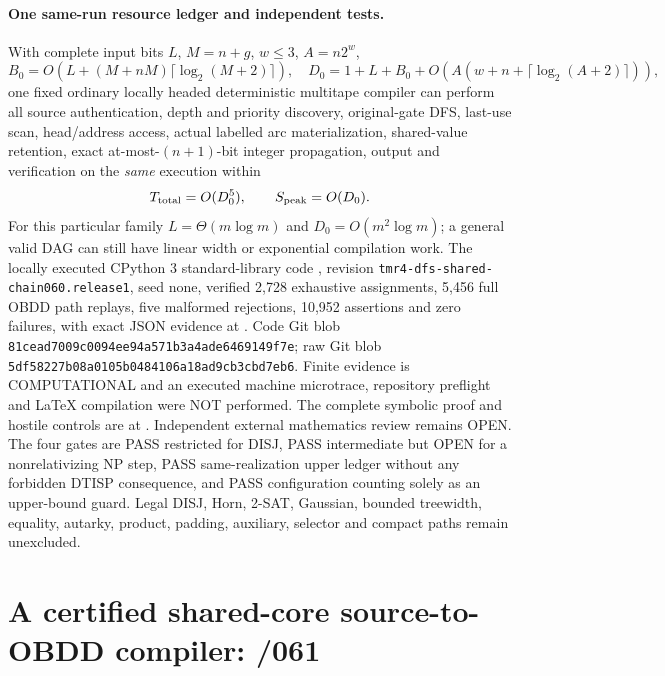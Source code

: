 \documentclass[11pt]{article}
\begin{document}
\paragraph{One same-run resource ledger and independent tests.}
With complete input bits $L$, $M=n+g$, $w\leq3$,
$A=n2^w$,
\[
B_0=O(L+(M+nM)\lceil\log_2(M+2)\rceil),\quad
D_0=1+L+B_0+O(A(w+n+\lceil\log_2(A+2)\rceil)),
\]
one fixed ordinary locally headed deterministic multitape compiler
can perform all source authentication, depth and priority discovery,
original-gate DFS, last-use scan, head/address access, actual
labelled arc materialization, shared-value retention, exact
at-most-$(n+1)$-bit integer propagation, output and verification
on the \emph{same} execution within
\[
T_{\rm total}=O(D_0^5),\qquad S_{\rm peak}=O(D_0).
\]
For this particular family $L=\Theta(m\log m)$ and
$D_0=O(m^2\log m)$; a general valid DAG can still have
linear width or exponential compilation work.
The locally executed CPython 3 standard-library code
,
revision \texttt{tmr4-dfs-shared-chain060.release1}, seed none,
verified 2,728 exhaustive assignments, 5,456 full OBDD
path replays, five malformed rejections, 10,952 assertions
and zero failures, with exact JSON evidence at
.
Code Git blob \texttt{81cead7009c0094ee94a571b3a4ade6469149f7e};
raw Git blob \texttt{5df58227b08a0105b0484106a18ad9cb3cbd7eb6}.
Finite evidence is COMPUTATIONAL and an executed machine microtrace,
repository preflight and LaTeX compilation were NOT performed.
The complete symbolic proof and hostile controls are at
.
Independent external mathematics review remains OPEN.
The four gates are PASS restricted for DISJ, PASS intermediate but OPEN
for a nonrelativizing NP step, PASS same-realization upper ledger
without any forbidden DTISP consequence, and PASS configuration
counting solely as an upper-bound guard. Legal DISJ, Horn, 2-SAT,
Gaussian, bounded treewidth, equality, autarky, product, padding,
auxiliary, selector and compact paths remain unexcluded.

\section{A certified shared-core source-to-OBDD compiler: /061}
\end{document}
